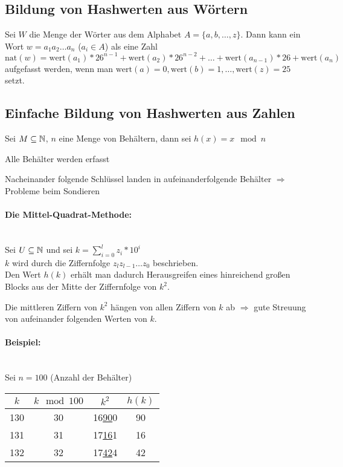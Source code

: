 \subsection{Bildung von Hashwerten aus Wörtern}
Sei $W$ die Menge der Wörter aus dem Alphabet $A = \{a, b, \ldots, z\}$. Dann kann ein Wort $w = a_1a_2\ldots a_n$ ($a_i \in A$) als eine Zahl $\text{nat}(w) = \text{wert}(a_1) * 26^{n−1} + \text{wert}(a_2) * 26^{n−2} + \ldots + \text{wert}(a_{n−1}) * 26 + \text{wert}(a_n)$ aufgefasst werden, wenn man $\text{wert}(a) = 0, \text{wert}(b) = 1, \ldots, \text{wert}(z) = 25$ setzt.

\subsection{Einfache Bildung von Hashwerten aus Zahlen}
Sei $M \subseteq \mathbb{N}$, $n$ eine Menge von Behältern, dann sei $h(x) = x \mod n$
\begin{compactitem}
	\item Alle Behälter werden erfasst
	\item Nacheinander folgende Schlüssel landen in aufeinanderfolgende Behälter $\Rightarrow$ Probleme beim Sondieren
\end{compactitem}

\paragraph{Die Mittel-Quadrat-Methode:}\quad\\
Sei $U \subseteq \mathbb{N}$ und sei $k=\sum\limits_{i=0}^{l}z_i*10^i$\\
$k$ wird durch die Ziffernfolge $z_lz_{l−1}\ldots z_0$ beschrieben.\\
Den Wert $h(k)$ erhält man dadurch {\flqq Herausgreifen\frqq} eines hinreichend großen Blocks aus der Mitte der Ziffernfolge von $k^2$.

Die mittleren Ziffern von $k^2$ hängen von allen Ziffern von $k$ ab $\Rightarrow$ gute Streuung von aufeinander folgenden Werten von $k$.

\paragraph{Beispiel:}\quad\\
Sei $n = 100$ (Anzahl der Behälter)\\
\begin{tabular}{|c|c|c|c|}
	\hline
	$k$ & $k\mod 100$ & $k^2$ & $h(k)$\\
	\hline
	130 & 30 & 16\ul{90}0 & 90\\
	\hline
	131 & 31 & 17\ul{16}1 & 16\\
	\hline
	132 & 32 & 17\ul{42}4 & 42\\
	\hline
\end{tabular}